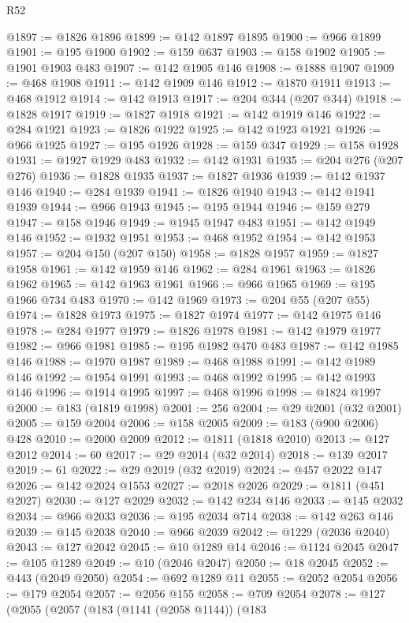 \begin{lexlean}{R52}
\begin{coremodule}
@1897 := @1826 @1896
@1899 := @142 @1897 @1895
@1900 := @966 @1899
@1901 := @195 @1900
@1902 := @159 @637
@1903 := @158 @1902
@1905 := @1901 @1903 @483
@1907 := @142 @1905 @146
@1908 := @1888 @1907
@1909 := @468 @1908
@1911 := @142 @1909 @146
@1912 := @1870 @1911
@1913 := @468 @1912
@1914 := @142 @1913
@1917 := @204 @344 (@207 @344)
@1918 := @1828 @1917
@1919 := @1827 @1918
@1921 := @142 @1919 @146
@1922 := @284 @1921
@1923 := @1826 @1922
@1925 := @142 @1923 @1921
@1926 := @966 @1925
@1927 := @195 @1926
@1928 := @159 @347
@1929 := @158 @1928
@1931 := @1927 @1929 @483
@1932 := @142 @1931
@1935 := @204 @276 (@207 @276)
@1936 := @1828 @1935
@1937 := @1827 @1936
@1939 := @142 @1937 @146
@1940 := @284 @1939
@1941 := @1826 @1940
@1943 := @142 @1941 @1939
@1944 := @966 @1943
@1945 := @195 @1944
@1946 := @159 @279
@1947 := @158 @1946
@1949 := @1945 @1947 @483
@1951 := @142 @1949 @146
@1952 := @1932 @1951
@1953 := @468 @1952
@1954 := @142 @1953
@1957 := @204 @150 (@207 @150)
@1958 := @1828 @1957
@1959 := @1827 @1958
@1961 := @142 @1959 @146
@1962 := @284 @1961
@1963 := @1826 @1962
@1965 := @142 @1963 @1961
@1966 := @966 @1965
@1969 := @195 @1966 @734 @483
@1970 := @142 @1969
@1973 := @204 @55 (@207 @55)
@1974 := @1828 @1973
@1975 := @1827 @1974
@1977 := @142 @1975 @146
@1978 := @284 @1977
@1979 := @1826 @1978
@1981 := @142 @1979 @1977
@1982 := @966 @1981
@1985 := @195 @1982 @470 @483
@1987 := @142 @1985 @146
@1988 := @1970 @1987
@1989 := @468 @1988
@1991 := @142 @1989 @146
@1992 := @1954 @1991
@1993 := @468 @1992
@1995 := @142 @1993 @146
@1996 := @1914 @1995
@1997 := @468 @1996
@1998 := @1824 @1997
@2000 := @183 (@1819 @1998)
@2001 := 256
@2004 := @29 @2001 (@32 @2001)
@2005 := @159 @2004
@2006 := @158 @2005
@2009 := @183 (@900 @2006) @428
@2010 := @2000 @2009
@2012 := @1811 (@1818 @2010)
@2013 := @127 @2012
@2014 := 60
@2017 := @29 @2014 (@32 @2014)
@2018 := @139 @2017
@2019 := 61
@2022 := @29 @2019 (@32 @2019)
@2024 := @457 @2022 @147
@2026 := @142 @2024 @1553
@2027 := @2018 @2026
@2029 := @1811 (@451 @2027)
@2030 := @127 @2029
@2032 := @142 @234 @146
@2033 := @145 @2032
@2034 := @966 @2033
@2036 := @195 @2034 @714
@2038 := @142 @263 @146
@2039 := @145 @2038
@2040 := @966 @2039
@2042 := @1229 (@2036 @2040)
@2043 := @127 @2042
@2045 := @10 @1289 @14
@2046 := @1124 @2045
@2047 := @105 @1289
@2049 := @10 (@2046 @2047)
@2050 := @18 @2045
@2052 := @443 (@2049 @2050)
@2054 := @692 @1289 @11
@2055 := @2052 @2054
@2056 := @179 @2054
@2057 := @2056 @155
@2058 := @709 @2054
@2078 := @127
    (@2055
      (@2057
        (@183
          (@1141 (@2058 @1144))
          (@183

\end{coremodule}
\end{lexlean}
